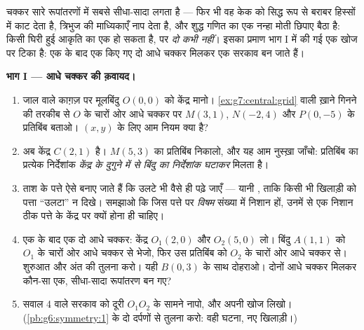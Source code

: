 \begin{problem}
\label{pb:g7:central:1}
 चक्कर सारे रूपांतरणों में सबसे सीधा-सादा लगता है --- फिर भी वह
केक को सिद्ध रूप से बराबर हिस्सों में काट देता है, त्रिभुज की
माध्यिकाएँ नाप देता है, और शुद्ध गणित का एक नन्हा मोती छिपाए बैठा
है: किसी घिरी हुई आकृति का एक  हो सकता है, पर
\emph{दो कभी नहीं}। इसका प्रमाण भाग I में की गई एक खोज पर टिका है:
एक के बाद एक किए गए दो आधे चक्कर मिलकर एक सरकाव बन जाते हैं।

\medskip
\noindent\textbf{भाग I --- आधे चक्कर की क़वायद।}
\begin{enumerate}
  \item जाल वाले काग़ज़ पर मूलबिंदु $O(0, 0)$ को केंद्र मानो।
        \cref{ex:g7:central:grid} वाली ख़ाने गिनने की तरकीब से
        $O$ के चारों ओर आधे चक्कर पर $M(3, 1)$, $N(-2, 4)$ और
        $P(0, -5)$ के प्रतिबिंब बताओ। $(x, y)$ के लिए आम नियम
        क्या है?
  \item अब केंद्र $C(2, 1)$ है। $M(5, 3)$ का प्रतिबिंब निकालो,
        और यह आम नुस्ख़ा जाँचो: प्रतिबिंब का प्रत्येक निर्देशांक
        \emph{केंद्र के दुगुने में से बिंदु का निर्देशांक घटाकर}
        मिलता है।
  \item ताश के पत्ते ऐसे बनाए जाते हैं कि उलटे भी वैसे ही पढ़े
        जाएँ --- यानी , ताकि किसी भी खिलाड़ी को
        पत्ता ``उलटा'' न दिखे। समझाओ कि जिस पत्ते पर
        \emph{विषम} संख्या में निशान हों, उनमें से एक निशान ठीक
        पत्ते के केंद्र पर क्यों होना ही चाहिए।
  \item एक के बाद एक दो आधे चक्कर: केंद्र $O_1(2, 0)$ और
        $O_2(5, 0)$ लो। बिंदु $A(1, 1)$ को $O_1$ के चारों ओर आधे
        चक्कर से भेजो, फिर उस प्रतिबिंब को $O_2$ के चारों ओर आधे
        चक्कर से। शुरुआत और अंत की तुलना करो। यही $B(0, 3)$ के
        साथ दोहराओ। दोनों आधे चक्कर मिलकर कौन-सा एक, सीधा-सादा
        रूपांतरण बन गए?
  \item सवाल 4 वाले सरकाव को दूरी $O_1 O_2$ के सामने नापो, और
        अपनी खोज लिखो। (\cref{pb:g6:symmetry:1} के दो 
        दर्पणों से तुलना करो: वही घटना, नए खिलाड़ी।)
\end{enumerate}


\end{problem}
